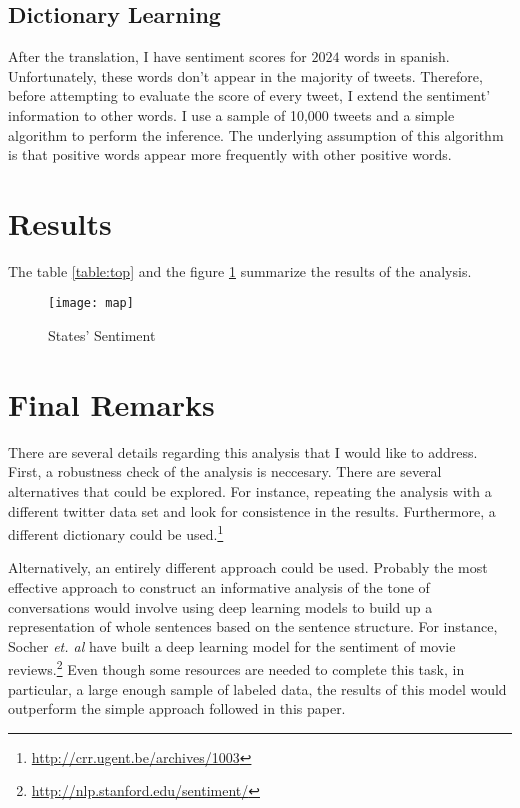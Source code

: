 \documentclass{article}
\begin{document}
\subsection{Dictionary Learning}
After the translation, I have sentiment scores for $2024$ words in spanish. Unfortunately, these words don't appear in the majority of tweets. Therefore, before attempting to evaluate the score of every tweet, I extend the sentiment' information to other words. I use a sample of 10,000 tweets and a simple algorithm to perform the inference. The underlying assumption of this algorithm is that positive words appear more frequently with other positive words.

\section{Results}
The table \ref{table:top} and the figure \ref{fig:states_sentiment} summarize the results of the analysis.
\begin{figure}[ht]
	\texttt{[image: map]}
	\caption{States' Sentiment}
	\label{fig:states_sentiment}
\end{figure}

\begin{table}[ht]
	\centering
	\quad
	\caption{Top states according to their sentiment scores}
	\label{table:top}
\end{table}

\section{Final Remarks}
There are several details regarding this analysis that I would like to address. First, a robustness check of the analysis is neccesary. There are several alternatives that could be explored. For instance, repeating the analysis with a different twitter data set and look for consistence in the results. Furthermore, a different dictionary could be used.\footnote{\url{http://crr.ugent.be/archives/1003}}

Alternatively, an entirely different approach could be used. Probably the most effective approach to construct an informative analysis of the tone of conversations would involve using deep learning models to build up a representation of whole sentences based on the sentence structure. For instance, Socher \emph{et. al } have built a deep learning model for the sentiment of movie reviews.\footnote{\url{http://nlp.stanford.edu/sentiment/}} Even though some resources are needed to complete this task, in particular, a large enough sample of labeled data, the results of this model would outperform the simple approach followed in this paper.
\end{document}
